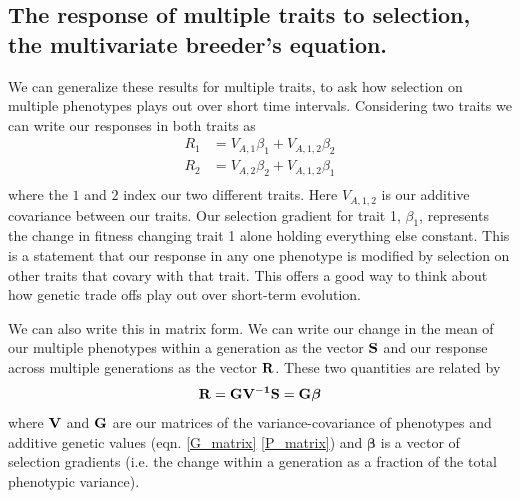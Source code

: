 \subsection{The response of multiple traits to selection, the
  multivariate breeder's equation.}
We can generalize these results for multiple traits, to ask how selection on
multiple phenotypes plays out over short time intervals. \cite{lande:79} Considering two traits we can write our responses in both traits as
\begin{eqnarray}
R_1 & = V_{A,1} \beta_1 + V_{A,1,2} \beta_2 \nonumber \\
R_2 & = V_{A,2} \beta_2 + V_{A,1,2} \beta_1  \nonumber \\
\end{eqnarray}
where the $1$ and $2$ index our two different traits. Here $V_{A,1,2}$ is our additive covariance between our traits. Our selection gradient for trait 1, $\beta_1$, represents the change in fitness changing trait 1 alone holding everything else constant. This is a statement that our response in any one phenotype is modified by selection on other traits that covary with that trait. This offers a good way to think about how genetic trade offs play out over short-term evolution.

We can also write this in matrix form. We can write
our change in the mean of our multiple phenotypes within a generation as the vector $\bf{S}$ and our response across multiple generations as
the vector $\bf{R}$. These two quantities are related by 
\begin{equation}
\bf{R} = \bf{G} \bf{V}^{-1} \bf{S} = \bf{G} \boldsymbol{ \beta}
\end{equation}
 where $\bf{V}$ and $\bf{G}$ are our matrices of the
 variance-covariance of phenotypes and additive genetic values
 (eqn. \eqref{G_matrix} \eqref{P_matrix}) and
 $\boldsymbol{\beta}$ is a vector of selection gradients (i.e. the change within a generation as a fraction of the total phenotypic variance). 

